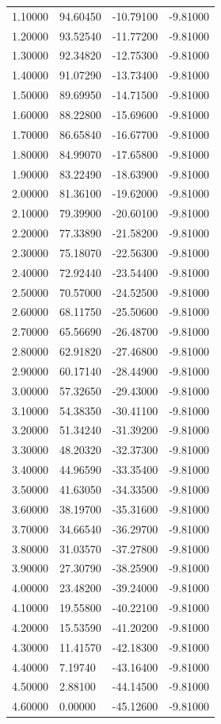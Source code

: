 \begin{table}
\begin{tabular}{llll}
1.10000 & 94.60450 & -10.79100 & -9.81000 \\
1.20000 & 93.52540 & -11.77200 & -9.81000 \\
1.30000 & 92.34820 & -12.75300 & -9.81000 \\
1.40000 & 91.07290 & -13.73400 & -9.81000 \\
1.50000 & 89.69950 & -14.71500 & -9.81000 \\
1.60000 & 88.22800 & -15.69600 & -9.81000 \\
1.70000 & 86.65840 & -16.67700 & -9.81000 \\
1.80000 & 84.99070 & -17.65800 & -9.81000 \\
1.90000 & 83.22490 & -18.63900 & -9.81000 \\
2.00000 & 81.36100 & -19.62000 & -9.81000 \\
2.10000 & 79.39900 & -20.60100 & -9.81000 \\
2.20000 & 77.33890 & -21.58200 & -9.81000 \\
2.30000 & 75.18070 & -22.56300 & -9.81000 \\
2.40000 & 72.92440 & -23.54400 & -9.81000 \\
2.50000 & 70.57000 & -24.52500 & -9.81000 \\
2.60000 & 68.11750 & -25.50600 & -9.81000 \\
2.70000 & 65.56690 & -26.48700 & -9.81000 \\
2.80000 & 62.91820 & -27.46800 & -9.81000 \\
2.90000 & 60.17140 & -28.44900 & -9.81000 \\
3.00000 & 57.32650 & -29.43000 & -9.81000 \\
3.10000 & 54.38350 & -30.41100 & -9.81000 \\
3.20000 & 51.34240 & -31.39200 & -9.81000 \\
3.30000 & 48.20320 & -32.37300 & -9.81000 \\
3.40000 & 44.96590 & -33.35400 & -9.81000 \\
3.50000 & 41.63050 & -34.33500 & -9.81000 \\
3.60000 & 38.19700 & -35.31600 & -9.81000 \\
3.70000 & 34.66540 & -36.29700 & -9.81000 \\
3.80000 & 31.03570 & -37.27800 & -9.81000 \\
3.90000 & 27.30790 & -38.25900 & -9.81000 \\
4.00000 & 23.48200 & -39.24000 & -9.81000 \\
4.10000 & 19.55800 & -40.22100 & -9.81000 \\
4.20000 & 15.53590 & -41.20200 & -9.81000 \\
4.30000 & 11.41570 & -42.18300 & -9.81000 \\
4.40000 & 7.19740 & -43.16400 & -9.81000 \\
4.50000 & 2.88100 & -44.14500 & -9.81000 \\
4.60000 & 0.00000 & -45.12600 & -9.81000 \\
\bottomrule
\end{tabular}
\end{table}
